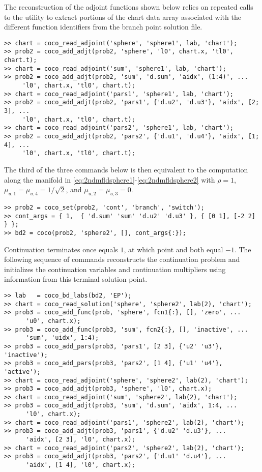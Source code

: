 The reconstruction of the adjoint functions shown below relies on repeated calls to the  utility to extract portions of the chart data array associated with the different function identifiers from the branch point solution file.
\begin{lstlisting}[language=coco-highlight]
>> chart = coco_read_adjoint('sphere', 'sphere1', lab, 'chart');
>> prob2 = coco_add_adjt(prob2, 'sphere', 'l0', chart.x, 'tl0', chart.t);
>> chart = coco_read_adjoint('sum', 'sphere1', lab, 'chart');
>> prob2 = coco_add_adjt(prob2, 'sum', 'd.sum', 'aidx', (1:4)', ...
     'l0', chart.x, 'tl0', chart.t);
>> chart = coco_read_adjoint('pars1', 'sphere1', lab, 'chart');
>> prob2 = coco_add_adjt(prob2, 'pars1', {'d.u2', 'd.u3'}, 'aidx', [2; 3], ...
     'l0', chart.x, 'tl0', chart.t);
>> chart = coco_read_adjoint('pars2', 'sphere1', lab, 'chart');
>> prob2 = coco_add_adjt(prob2, 'pars2', {'d.u1', 'd.u4'}, 'aidx', [1; 4], ...
     'l0', chart.x, 'tl0', chart.t);
\end{lstlisting}  
The third of the three commands below is then equivalent to the computation along the manifold in \eqref{eq:2ndmfldsphere1}-\eqref{eq:2ndmfldsphere2} with $\rho=1$, $\mu_{u,1}=\mu_{u,4}=1/\sqrt{2}$, and $\mu_{u,2}=\mu_{u,3}=0$.
\begin{lstlisting}[language=coco-highlight]
>> prob2 = coco_set(prob2, 'cont', 'branch', 'switch');
>> cont_args = { 1,  { 'd.sum' 'sum' 'd.u2' 'd.u3' }, { [0 1], [-2 2] } };
>> bd2 = coco(prob2, 'sphere2', [], cont_args{:});
\end{lstlisting}
Continuation terminates once  equals $1$, at which point  and  both equal $-1$. The following sequence of commands reconstructs the continuation problem and initializes the continuation variables and continuation multipliers using information from this terminal solution point.
\begin{lstlisting}[language=coco-highlight]
>> lab   = coco_bd_labs(bd2, 'EP');
>> chart = coco_read_solution('sphere', 'sphere2', lab(2), 'chart');
>> prob3 = coco_add_func(prob, 'sphere', fcn1{:}, [], 'zero', ...
      'u0', chart.x);
>> prob3 = coco_add_func(prob3, 'sum', fcn2{:}, [], 'inactive', ...
      'sum', 'uidx', 1:4);
>> prob3 = coco_add_pars(prob3, 'pars1', [2 3], {'u2' 'u3'}, 'inactive');
>> prob3 = coco_add_pars(prob3, 'pars2', [1 4], {'u1' 'u4'}, 'active');
>> chart = coco_read_adjoint('sphere', 'sphere2', lab(2), 'chart');
>> prob3 = coco_add_adjt(prob3, 'sphere', 'l0', chart.x);
>> chart = coco_read_adjoint('sum', 'sphere2', lab(2), 'chart');
>> prob3 = coco_add_adjt(prob3, 'sum', 'd.sum', 'aidx', 1:4, ...
      'l0', chart.x);
>> chart = coco_read_adjoint('pars1', 'sphere2', lab(2), 'chart');
>> prob3 = coco_add_adjt(prob3, 'pars1', {'d.u2' 'd.u3'}, ...
      'aidx', [2 3], 'l0', chart.x);
>> chart = coco_read_adjoint('pars2', 'sphere2', lab(2), 'chart');
>> prob3 = coco_add_adjt(prob3, 'pars2', {'d.u1' 'd.u4'}, ...
      'aidx', [1 4], 'l0', chart.x);
\end{lstlisting}
